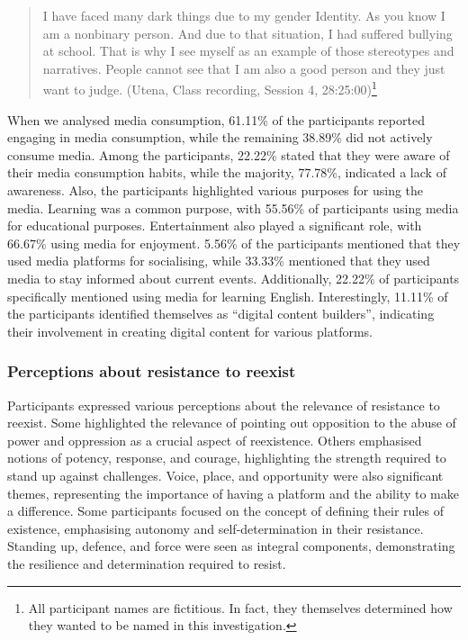 \documentclass[english]{textolivre}
\begin{document}
\begin{quote}
    I have faced many dark things due to my gender Identity. As you know I am a nonbinary person. And due to that situation, I had suffered bullying at school. That is why I see myself as an example of those stereotypes and narratives. People cannot see that I am also a good person and they just want to judge. (Utena, Class recording, Session 4, 28:25:00)\footnote{All participant names are fictitious. In fact, they themselves determined how they wanted to be named in this investigation.}
\end{quote}

When we analysed media consumption, 61.11\% of the participants reported engaging in media consumption, while the remaining 38.89\% did not actively consume media. Among the participants, 22.22\% stated that they were aware of their media consumption habits, while the majority, 77.78\%, indicated a lack of awareness. Also, the participants highlighted various purposes for using the media. Learning was a common purpose, with 55.56\% of participants using media for educational purposes. Entertainment also played a significant role, with 66.67\% using media for enjoyment. 5.56\% of the participants mentioned that they used media platforms for socialising, while 33.33\% mentioned that they used media to stay informed about current events. Additionally, 22.22\% of participants specifically mentioned using media for learning English. Interestingly, 11.11\% of the participants identified themselves as “digital content builders”, indicating their involvement in creating digital content for various platforms.

\subsubsection{Perceptions about resistance to reexist}\label{sec-idioma}
Participants expressed various perceptions about the relevance of resistance to reexist. Some highlighted the relevance of pointing out opposition to the abuse of power and oppression as a crucial aspect of reexistence. Others emphasised notions of potency, response, and courage, highlighting the strength required to stand up against challenges. Voice, place, and opportunity were also significant themes, representing the importance of having a platform and the ability to make a difference. Some participants focused on the concept of defining their rules of existence, emphasising autonomy and self-determination in their resistance. Standing up, defence, and force were seen as integral components, demonstrating the resilience and determination required to resist.
\end{document}
